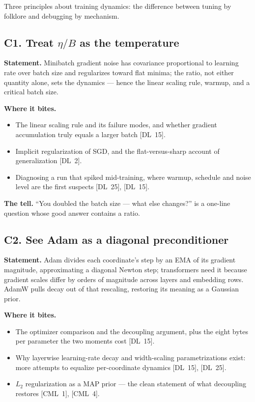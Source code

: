 Three principles about training dynamics: the difference between tuning by folklore and debugging by mechanism.

\subsection*{C1. Treat $\eta/B$ as the temperature}

\textbf{Statement.} Minibatch gradient noise has covariance proportional to learning rate over batch size and regularizes toward flat minima; the ratio, not either quantity alone, sets the dynamics --- hence the linear scaling rule, warmup, and a critical batch size.

\textbf{Where it bites.}
\begin{itemize}[itemsep=1pt,topsep=2pt,leftmargin=1.3em]
\item The linear scaling rule and its failure modes, and whether gradient accumulation truly equals a larger batch [DL~15].
\item Implicit regularization of SGD, and the flat-versus-sharp account of generalization [DL~2].
\item Diagnosing a run that spiked mid-training, where warmup, schedule and noise level are the first suspects [DL~25], [DL~15].
\end{itemize}

\textbf{The tell.} ``You doubled the batch size --- what else changes?'' is a one-line question whose good answer contains a ratio.

\subsection*{C2. See Adam as a diagonal preconditioner}

\textbf{Statement.} Adam divides each coordinate's step by an EMA of its gradient magnitude, approximating a diagonal Newton step; transformers need it because gradient scales differ by orders of magnitude across layers and embedding rows. AdamW pulls decay out of that rescaling, restoring its meaning as a Gaussian prior.

\textbf{Where it bites.}
\begin{itemize}[itemsep=1pt,topsep=2pt,leftmargin=1.3em]
\item The optimizer comparison and the decoupling argument, plus the eight bytes per parameter the two moments cost [DL~15].
\item Why layerwise learning-rate decay and width-scaling parametrizations exist: more attempts to equalize per-coordinate dynamics [DL~15], [DL~25].
\item $L_2$ regularization as a MAP prior --- the clean statement of what decoupling restores [CML~1], [CML~4].
\end{itemize}

